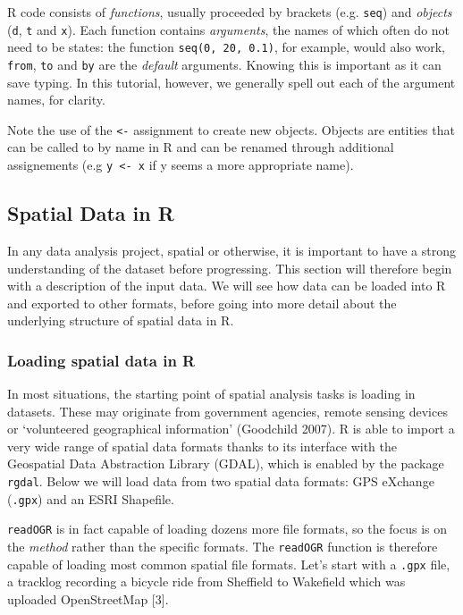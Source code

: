 \documentclass[]{article}
\begin{document}
R code consists of \emph{functions}, usually proceeded by brackets (e.g.
\texttt{seq}) and \emph{objects} (\texttt{d}, \texttt{t} and
\texttt{x}). Each function contains \emph{arguments}, the names of which
often do not need to be states: the function \texttt{seq(0, 20, 0.1)},
for example, would also work, \texttt{from}, \texttt{to} and \texttt{by}
are the \emph{default} arguments. Knowing this is important as it can
save typing. In this tutorial, however, we generally spell out each of
the argument names, for clarity.

Note the use of the \texttt{\textless{}-} assignment to create new
objects. Objects are entities that can be called to by name in R and can
be renamed through additional assignements (e.g
\texttt{y \textless{}- x} if y seems a more appropriate name).

\subsection{Spatial Data in R}

In any data analysis project, spatial or otherwise, it is important to
have a strong understanding of the dataset before progressing. This
section will therefore begin with a description of the input data. We
will see how data can be loaded into R and exported to other formats,
before going into more detail about the underlying structure of spatial
data in R.

\subsubsection{Loading spatial data in R}

In most situations, the starting point of spatial analysis tasks is
loading in datasets. These may originate from government agencies,
remote sensing devices or `volunteered geographical information'
(Goodchild 2007). R is able to import a very wide range of spatial data
formats thanks to its interface with the Geospatial Data Abstraction
Library (GDAL), which is enabled by the package \texttt{rgdal}. Below we
will load data from two spatial data formats: GPS eXchange
(\texttt{.gpx}) and an ESRI Shapefile.

\texttt{readOGR} is in fact capable of loading dozens more file formats,
so the focus is on the \emph{method} rather than the specific formats.
The \texttt{readOGR} function is therefore capable of loading most
common spatial file formats. Let's start with a \texttt{.gpx} file, a
tracklog recording a bicycle ride from Sheffield to Wakefield which was
uploaded OpenStreetMap {[}3{]}.
\end{document}
